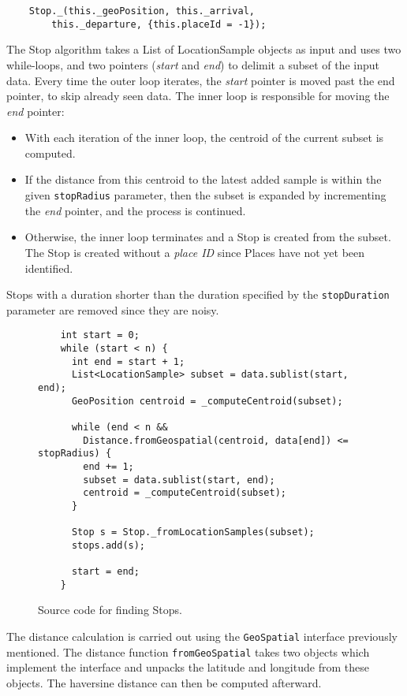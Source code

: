 \begin{verbatim}
    Stop._(this._geoPosition, this._arrival, 
        this._departure, {this.placeId = -1});
\end{verbatim}

The Stop algorithm takes a List of LocationSample objects as input and uses two while-loops, and two pointers (\textit{start} and \textit{end}) to delimit a subset of the input data. Every time the outer loop iterates, the \textit{start} pointer is moved past the end pointer, to skip already seen data. The inner loop is responsible for moving the \textit{end} pointer: \begin{itemize}
    \item With each iteration of the inner loop, the centroid of the current subset is computed.
    \item If the distance from this centroid to the latest added sample is within the given \verb|stopRadius| parameter, then the subset is expanded by incrementing the \textit{end} pointer, and the process is continued.
    \item Otherwise, the inner loop terminates and a Stop is created from the subset. The Stop is created without a \textit{place ID} since Places  have not yet been identified.
\end{itemize}

Stops with a duration shorter than the duration specified by the \verb|stopDuration| parameter are removed since they are noisy. 

\begin{figure}[h]
    \centering
    \begin{verbatim}
    int start = 0;
    while (start < n) {
      int end = start + 1;
      List<LocationSample> subset = data.sublist(start, end);
      GeoPosition centroid = _computeCentroid(subset);
        
      while (end < n && 
        Distance.fromGeospatial(centroid, data[end]) <= stopRadius) {
        end += 1;
        subset = data.sublist(start, end);
        centroid = _computeCentroid(subset);
      }
    
      Stop s = Stop._fromLocationSamples(subset);
      stops.add(s);
    
      start = end;
    }
\end{verbatim}
    \caption{Source code for finding Stops.}
    \label{fig:source-code-stops}
\end{figure}

The distance calculation is carried out using the \verb|GeoSpatial| interface previously mentioned. The distance function \verb|fromGeoSpatial| takes two objects which implement the interface and unpacks the latitude and longitude from these objects. The haversine distance can then be computed afterward.

